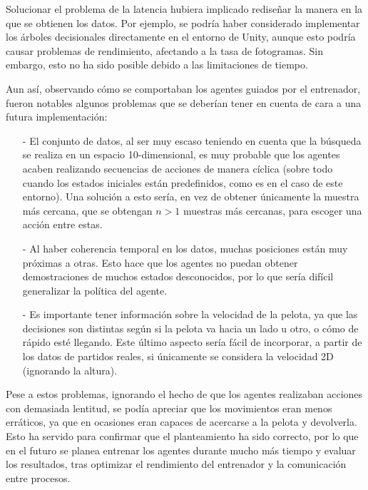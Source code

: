Solucionar el problema de la latencia hubiera implicado rediseñar la manera en la que se obtienen los datos. Por ejemplo, se podría haber considerado implementar los árboles decisionales directamente en el entorno de Unity, aunque esto podría causar problemas de rendimiento, afectando a la tasa de fotogramas. Sin embargo, esto no ha sido posible debido a las limitaciones de tiempo.

Aun así, observando cómo se comportaban los agentes guiados por el entrenador, fueron notables algunos problemas que se deberían tener en cuenta de cara a una futura implementación:
\begin{enumerate}
    \item[-] El conjunto de datos, al ser muy escaso teniendo en cuenta que la búsqueda se realiza en un espacio 10-dimensional, es muy probable que los agentes acaben realizando secuencias de acciones de manera cíclica (sobre todo cuando los estados iniciales están predefinidos, como es en el caso de este entorno). Una solución a esto sería, en vez de obtener únicamente la muestra más cercana, que se obtengan $n > 1$ muestras más cercanas, para escoger una acción entre estas.
    \item[-] Al haber coherencia temporal en los datos, muchas posiciones están muy próximas a otras. Esto hace que los agentes no puedan obtener demostraciones de muchos estados desconocidos, por lo que sería difícil generalizar la política del agente.
    \item[-] Es importante tener información sobre la velocidad de la pelota, ya que las decisiones son distintas según si la pelota va hacia un lado u otro, o cómo de rápido esté llegando. Este último aspecto sería fácil de incorporar, a partir de los datos de partidos reales, si únicamente se considera la velocidad 2D (ignorando la altura).
\end{enumerate}

Pese a estos problemas, ignorando el hecho de que los agentes realizaban acciones con demasiada lentitud, se podía apreciar que los movimientos eran menos erráticos, ya que en ocasiones eran capaces de acercarse a la pelota y devolverla. Esto ha servido para confirmar que el planteamiento ha sido correcto, por lo que en el futuro se planea entrenar los agentes durante mucho más tiempo y evaluar los resultados, tras optimizar el rendimiento del entrenador y la comunicación entre procesos.  